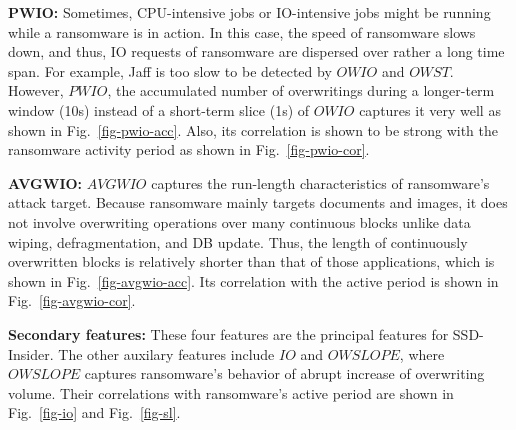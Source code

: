 \documentclass[conference]{IEEEtran}
\newcommand{\ours}{SSD-Insider}
\begin{document}
{\bf PWIO:} Sometimes, CPU-intensive jobs or IO-intensive jobs might be running 
while a ransomware is in action.
In this case, the speed of ransomware slows down, and thus, 
IO requests of ransomware are dispersed over 
rather a long time span. For example, Jaff is too slow to be detected by $OWIO$ and $OWST$.
However, $PWIO$, the accumulated number of overwritings 
during a longer-term window (10s) instead of a short-term slice (1s) of $OWIO$ 
captures it very well as shown in Fig.~\ref{fig-pwio-acc}. Also, its correlation is 
shown to be strong with the ransomware activity period as shown in Fig.~\ref{fig-pwio-cor}.

{\bf AVGWIO:} $AVGWIO$ captures the run-length characteristics of ransomware's attack target. 
Because ransomware mainly targets documents and images, 
it does not involve overwriting operations
over many continuous blocks unlike data wiping, defragmentation, and DB update.  
Thus, the length of continuously overwritten blocks is relatively shorter than that of those applications, which is shown in Fig.~\ref{fig-avgwio-acc}. Its correlation with the active 
period is shown in Fig.~\ref{fig-avgwio-cor}.

{\bf Secondary features:} These four features are the principal features for \ours{}.
The other auxilary features include $IO$ and $OWSLOPE$, 
where $OWSLOPE$ captures ransomware's behavior of abrupt increase of overwriting volume.
Their correlations with ransomware's active period are shown in Fig.~\ref{fig-io} and
Fig.~\ref{fig-sl}.
\end{document}
